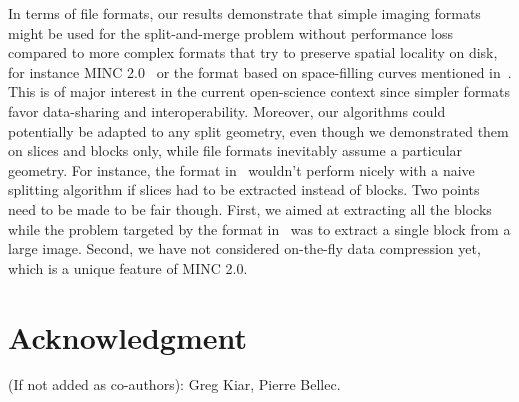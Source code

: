 \documentclass[10pt, conference, compsocconf]{IEEEtran}
\begin{document}
In terms of file formats, our results demonstrate that simple imaging
formats might be used for the split-and-merge problem without
performance loss compared to more complex formats that try to preserve
spatial locality on disk, for instance MINC 2.0~\cite{vincent2016minc}
or the format based on space-filling curves mentioned
in~\cite{burns2013open}. This is of major interest in the current
open-science context since simpler formats favor data-sharing and
interoperability.  Moreover, our algorithms could potentially be
adapted to any split geometry, even though we demonstrated them on
slices and blocks only, while file formats inevitably assume a
particular geometry. For instance, the format in~\cite{burns2013open}
wouldn't perform nicely with a naive splitting algorithm if slices had
to be extracted instead of blocks.  Two points need to be made to be
fair though. First, we aimed at extracting all the blocks while the
problem targeted by the format in~\cite{burns2013open} was to extract
a single block from a large image. Second, we have not considered
on-the-fly data compression yet, which is a unique feature of MINC
2.0.


\section*{Acknowledgment}

(If not added as co-authors): Greg Kiar, Pierre Bellec.



\end{document}
